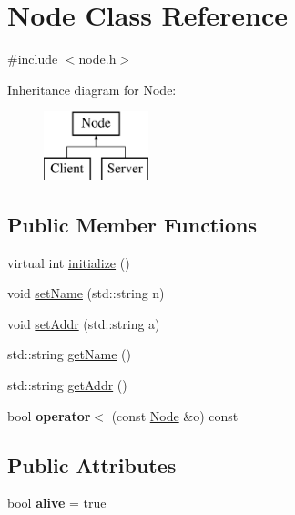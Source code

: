 \hypertarget{classNode}{}\section{Node Class Reference}
\label{classNode}


{\ttfamily \#include $<$node.\+h$>$}

Inheritance diagram for Node\+:\begin{figure}[H]
\begin{center}
\leavevmode
\includegraphics[height=2.000000cm]{classNode}
\end{center}
\end{figure}
\subsection*{Public Member Functions}
\begin{DoxyCompactItemize}
\item 
virtual int \mbox{\hyperlink{classNode_acfbc12d3b7d414fb12811041b04a1809}{initialize}} ()
\item 
void \mbox{\hyperlink{classNode_af79916b6bb2580b7cf9397bdeb172988}{set\+Name}} (std\+::string n)
\item 
void \mbox{\hyperlink{classNode_a17aec62f8f89db9e1d1a4047e3e97256}{set\+Addr}} (std\+::string a)
\item 
std\+::string \mbox{\hyperlink{classNode_a3e5ac6b5881a3a9d82f3112953c1e546}{get\+Name}} ()
\item 
std\+::string \mbox{\hyperlink{classNode_afccc68447572f5a9d19763984739117d}{get\+Addr}} ()
\item 
\mbox{\label{classNode_a9cdcf36692ef97435389e5049f1a701f}} 
bool {\bfseries operator$<$} (const \mbox{\hyperlink{classNode}{Node}} \&o) const
\end{DoxyCompactItemize}
\subsection*{Public Attributes}
\begin{DoxyCompactItemize}
\item 
\mbox{\label{classNode_a00158aa52528c00b589d98ce6457dfed}} 
bool {\bfseries alive} = true
\end{DoxyCompactItemize}
